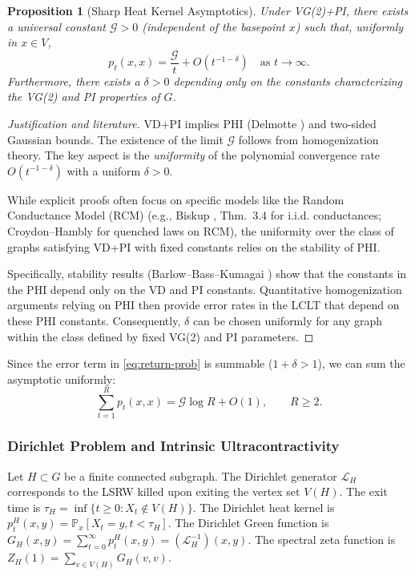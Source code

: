 \documentclass[12pt]{amsart}
\newtheorem{proposition}[theorem]{Proposition}
\theoremstyle{definition}
\theoremstyle{remark}
\newcommand{\cG}{\mathcal{G}}    %
\newcommand{\LL}{\mathcal{L}} %
\newcommand{\Prob}{\mathbb{P}}
\begin{document}
\begin{proposition}[Sharp Heat Kernel Asymptotics]\label{prop:HK_asymp}
Under VG(2)+PI, there exists a universal constant $\cG > 0$ (independent of the basepoint $x$) such that, uniformly in $x \in V$,
\begin{equation}\label{eq:return-prob}
p_t(x,x) = \frac{\cG}{t} + O(t^{-1-\delta}) \quad \text{as } t \to \infty.
\end{equation}
Furthermore, there exists a $\delta > 0$ depending only on the constants characterizing the VG(2) and PI properties of $G$.
\end{proposition}
\begin{proof}[Justification and literature]
VD+PI implies PHI (Delmotte \cite{Delmotte99}) and two-sided Gaussian bounds. The existence of the limit $\cG$ follows from homogenization theory. The key aspect is the \emph{uniformity} of the polynomial convergence rate $O(t^{-1-\delta})$ with a uniform $\delta>0$.

While explicit proofs often focus on specific models like the Random Conductance Model (RCM) (e.g., Biskup \cite{Biskup11}, Thm.\ 3.4 for i.i.d. conductances; Croydon--Hambly \cite{CroydonHambly21} for quenched laws on RCM), the uniformity over the class of graphs satisfying VD+PI with fixed constants relies on the stability of PHI.

Specifically, stability results (Barlow--Bass--Kumagai \cite{BarlowBassKumagai09}) show that the constants in the PHI depend only on the VD and PI constants. Quantitative homogenization arguments relying on PHI then provide error rates in the LCLT that depend on these PHI constants. Consequently, $\delta$ can be chosen uniformly for any graph within the class defined by fixed VG(2) and PI parameters.
\end{proof}

Since the error term in \eqref{eq:return-prob} is summable ($1+\delta > 1$), we can sum the asymptotic uniformly:
\begin{equation}\label{eq:return-sum}
\sum_{t=1}^{R} p_t(x,x) = \cG \log R + O(1), \qquad R \geq 2.
\end{equation}

\subsubsection{Dirichlet Problem and Intrinsic Ultracontractivity}
Let $H \subset G$ be a finite connected subgraph.
The Dirichlet generator $\LL_H$ corresponds to the LSRW killed upon exiting the vertex set $V(H)$. The exit time is $\tau_H = \inf\{t \geq 0 : X_t \notin V(H)\}$.
The Dirichlet heat kernel is $p_t^H(x,y) = \Prob_x[X_t = y, t < \tau_H]$. The Dirichlet Green function is $G_H(x,y) = \sum_{t=0}^{\infty} p_t^H(x,y) = (\LL_H^{-1})(x,y)$. The spectral zeta function is $Z_H(1) = \sum_{v \in V(H)} G_H(v,v)$.
\end{document}
